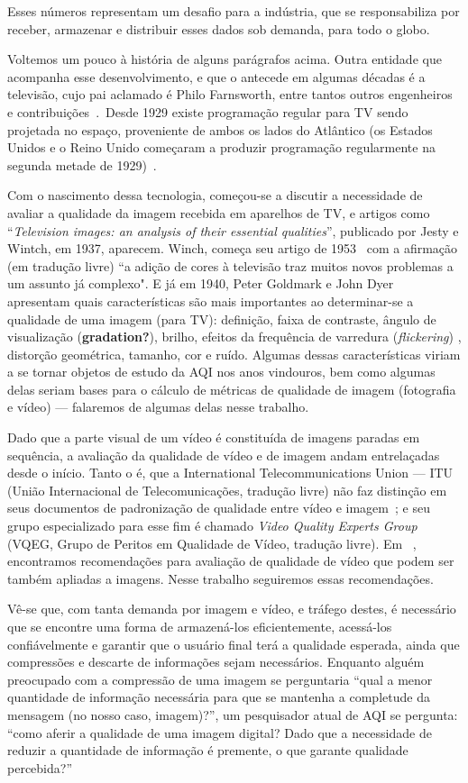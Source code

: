 	Esses números representam um desafio para a indústria, que se responsabiliza por receber, armazenar e distribuir esses dados sob demanda, para todo o globo.

	Voltemos um pouco à história de alguns parágrafos acima. Outra entidade que acompanha esse desenvolvimento, e que o antecede em algumas décadas é a televisão, cujo pai aclamado é Philo Farnsworth, entre tantos outros engenheiros e contribuições~\cite{tvhist}.\ Desde 1929 existe programação regular para TV sendo projetada no espaço, proveniente de ambos os lados do Atlântico (os Estados Unidos e o Reino Unido começaram a produzir programação regularmente na segunda metade de 1929)~\cite{tvhist}. 

	Com o nascimento dessa tecnologia, começou-se a discutir a necessidade de avaliar a qualidade da imagem recebida em aparelhos de TV, e artigos como ``{\em Television images: an analysis of their essential qualities}'', publicado por Jesty e Wintch, em 1937\cite{Jesty1937}, aparecem. Winch, começa seu artigo de 1953~\cite{Winch1953} com a afirmação (em tradução livre) ``a adição de cores à televisão traz muitos novos problemas a um assunto já complexo". E já em 1940, Peter Goldmark e John Dyer ~\cite{Goldmark1940} apresentam quais características são mais importantes ao determinar-se a qualidade de uma imagem (para TV): definição, faixa de contraste, ângulo de visualização (\textbf{gradation?}), brilho, efeitos da frequência de varredura ({\em flickering}) , distorção geométrica, tamanho, cor e ruído. Algumas dessas características viriam a se tornar objetos de estudo da AQI nos anos vindouros, bem como algumas delas seriam bases para o cálculo de métricas de qualidade de imagem (fotografia e vídeo) --- falaremos de algumas delas nesse trabalho.

	Dado que a parte visual de um vídeo é constituída de imagens paradas em sequência, a avaliação da qualidade de vídeo e de imagem andam entrelaçadas desde o início. Tanto o é, que a International Telecommunications Union --- ITU (União Internacional de Telecomunicações, tradução livre) não faz distinção em seus documentos de padronização de qualidade entre vídeo e imagem~\cite{itut2004}; e seu grupo especializado para esse fim é chamado {\em Video Quality Experts Group} (VQEG, Grupo de Peritos em Qualidade de Vídeo, tradução livre). Em ~\cite{itut2004}, encontramos recomendações para avaliação de qualidade de vídeo que podem ser também apliadas a imagens. Nesse trabalho seguiremos essas recomendações.

	Vê-se que, com tanta demanda por imagem e vídeo, e tráfego destes, é necessário que se encontre uma forma de armazená-los eficientemente, acessá-los confiávelmente e garantir que o usuário final terá a qualidade esperada, ainda que compressões e descarte de informações sejam necessários. Enquanto alguém preocupado com a compressão de uma imagem se perguntaria ``qual a menor quantidade de informação necessária para que se mantenha a completude da mensagem (no nosso caso, imagem)?'', um pesquisador atual de AQI se pergunta: ``como aferir a qualidade de uma imagem digital? Dado que a necessidade de reduzir a quantidade de informação é premente, o que garante qualidade percebida?''

